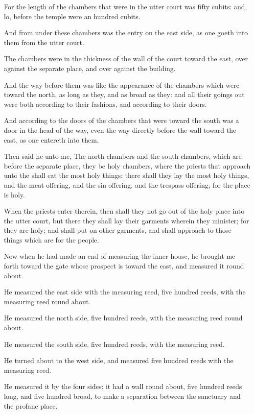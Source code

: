 \Verse For the length of the chambers that were in the utter court was fifty cubits: and, lo, before the temple were an hundred cubits.

\Verse And from under these chambers was the entry on the east side, as one goeth into them from the utter court.

\Verse The chambers were in the thickness of the wall of the court toward the east, over against the separate place, and over against the building.

\Verse And the way before them was like the appearance of the chambers which were toward the north, as long as they, and as broad as they: and all their goings out were both according to their fashions, and according to their doors.

\Verse And according to the doors of the chambers that were toward the south was a door in the head of the way, even the way directly before the wall toward the east, as one entereth into them.

\Verse Then said he unto me, The north chambers and the south chambers, which are before the separate place, they be holy chambers, where the priests that approach unto the \LORD shall eat the most holy things: there shall they lay the most holy things, and the meat offering, and the sin offering, and the trespass offering; for the place is holy.

\Verse When the priests enter therein, then shall they not go out of the holy place into the utter court, but there they shall lay their garments wherein they minister; for they are holy; and shall put on other garments, and shall approach to those things which are for the people.

\Verse Now when he had made an end of measuring the inner house, he brought me forth toward the gate whose prospect is toward the east, and measured it round about.

\Verse He measured the east side with the measuring reed, five hundred reeds, with the measuring reed round about.

\Verse He measured the north side, five hundred reeds, with the measuring reed round about.

\Verse He measured the south side, five hundred reeds, with the measuring reed.

\Verse He turned about to the west side, and measured five hundred reeds with the measuring reed.

\Verse He measured it by the four sides: it had a wall round about, five hundred reeds long, and five hundred broad, to make a separation between the sanctuary and the profane place.


